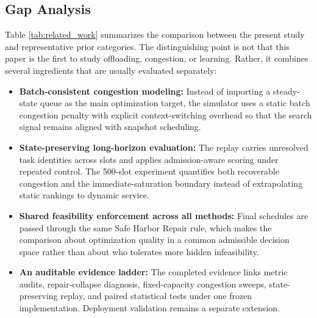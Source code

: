 \subsection{Gap Analysis}
Table \ref{tab:related_work} summarizes the comparison between the present study and representative prior categories. The distinguishing point is not that this paper is the first to study offloading, congestion, or learning. Rather, it combines several ingredients that are usually evaluated separately:
\begin{itemize}
    \item \textbf{Batch-consistent congestion modeling:} Instead of importing a steady-state queue as the main optimization target, the simulator uses a static batch congestion penalty with explicit context-switching overhead so that the search signal remains aligned with snapshot scheduling.
    \item \textbf{State-preserving long-horizon evaluation:} The replay carries unresolved task identities across slots and applies admission-aware scoring under repeated control. The 500-slot experiment quantifies both recoverable congestion and the immediate-saturation boundary instead of extrapolating static rankings to dynamic service.
    \item \textbf{Shared feasibility enforcement across all methods:} Final schedules are passed through the same Safe Harbor Repair rule, which makes the comparison about optimization quality in a common admissible decision space rather than about who tolerates more hidden infeasibility.
    \item \textbf{An auditable evidence ladder:} The completed evidence links metric audits, repair-collapse diagnosis, fixed-capacity congestion sweeps, state-preserving replay, and paired statistical tests under one frozen implementation. Deployment validation remains a separate extension.
\end{itemize}

